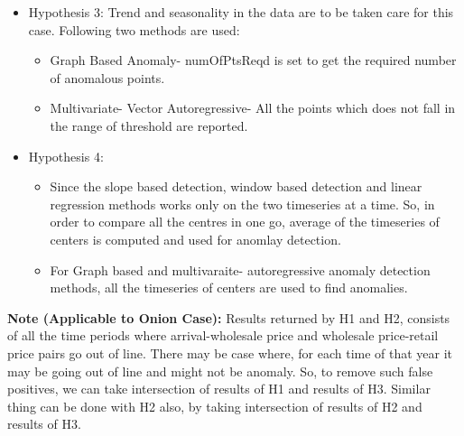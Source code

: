 \begin{itemize}
\item Hypothesis 3: Trend and seasonality in the data are to be taken care for this case. Following two methods are used:
    \begin{itemize}
      \item Graph Based Anomaly- numOfPtsReqd is set to get the required number of anomalous points.
      \item Multivariate- Vector Autoregressive- All the points which does not fall in the range of threshold are reported.
    \end{itemize}
    
\item Hypothesis 4:
    \begin{itemize}
      \item Since the slope based detection, window based detection and linear regression methods works only on the two timeseries at a time. So, in order to compare all the centres in one go, average of the timeseries of centers is computed and used for anomlay detection. 
      \item For Graph based and multivaraite- autoregressive anomaly detection methods, all the timeseries of centers are used to find anomalies.
    \end{itemize}
    

\end{itemize}

\textbf{Note (Applicable to Onion Case):} Results returned by H1 and H2, consists of all the time periods where arrival-wholesale price and wholesale price-retail price pairs go out of line. There may be case where, for each time of that year it may be going out of line and might not be anomaly. So, to remove such false positives, we can take intersection of results of H1 and results of H3. Similar thing can be done with H2 also, by taking  intersection of results of H2 and results of H3.


